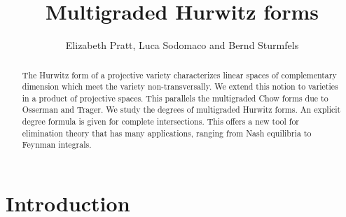 \documentclass[12pt]{article}
\title{\bf Multigraded Hurwitz forms}
\author{Elizabeth Pratt, Luca Sodomaco and Bernd Sturmfels}
\date{}
\theoremstyle{definition}
\begin{document}
\maketitle

\begin{abstract} 
\noindent
The Hurwitz form of a projective variety
characterizes linear spaces of complementary dimension
which meet the variety non-transversally.
We extend this  notion to varieties in a product of projective spaces.
This parallels the multigraded Chow forms due to Osserman and Trager.
 We study the degrees of multigraded Hurwitz forms.
 An explicit degree formula is given for complete intersections.
This offers a new tool for elimination theory that has
many applications, ranging from Nash equilibria to Feynman integrals.
\end{abstract}

\section{Introduction}\label{sec:Introduction}
\end{document}
